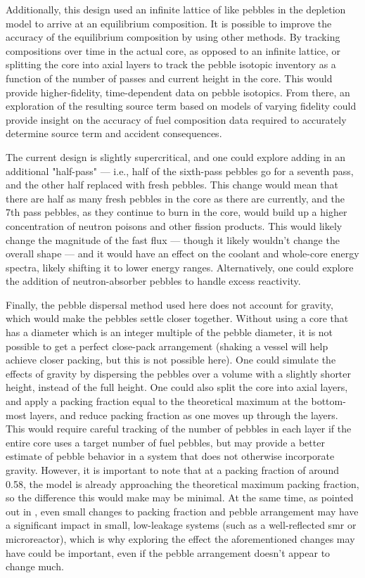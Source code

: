 Additionally, this design used an infinite lattice of like pebbles in the depletion model to arrive at an equilibrium composition.  It is possible to improve the accuracy of the equilibrium composition by using other methods.  By tracking compositions over time in the actual core, as opposed to an infinite lattice, or splitting the core into axial layers to track the pebble isotopic inventory as a function of the number of passes and current height in the core.  This would provide higher-fidelity, time-dependent data on pebble isotopics.  From there, an exploration of the resulting source term based on models of varying fidelity could provide insight on the accuracy of fuel composition data required to accurately determine source term and accident consequences.

The current design is slightly supercritical, and one could explore adding in an additional "half-pass" --- i.e., half of the sixth-pass pebbles go for a seventh pass, and the other half replaced with fresh pebbles.  This change would mean that there are half as many fresh pebbles in the core as there are currently, and the 7th pass pebbles, as they continue to burn in the core, would build up a higher concentration of neutron poisons and other fission products.  This would likely change the magnitude of the fast flux --- though it likely wouldn't change the overall shape --- and it would have an effect on the coolant and whole-core energy spectra, likely shifting it to lower energy ranges.  Alternatively, one could explore the addition of neutron-absorber pebbles to handle excess reactivity.

Finally, the pebble dispersal method used here does not account for gravity, which would make the pebbles settle closer together.  Without using a core that has a diameter which is an integer multiple of the pebble diameter, it is not possible to get a perfect close-pack arrangement (shaking a vessel will help achieve closer packing, but this is not possible here).  One could simulate the effects of gravity by dispersing the pebbles over a volume with a slightly shorter height, instead of the full height.  One could also split the core into axial layers, and apply a packing fraction equal to the theoretical maximum at the bottom-most layers, and reduce packing fraction as one moves up through the layers.  This would require careful tracking of the number of pebbles in each layer if the entire core uses a target number of fuel pebbles, but may provide a better estimate of pebble behavior in a system that does not otherwise incorporate gravity.  However, it is important to note that at a packing fraction of around 0.58, the model is already approaching the theoretical maximum packing fraction, so the difference this would make may be minimal.  At the same time, as pointed out in \cite{karriem_mcnp_2001}, even small changes to packing fraction and pebble arrangement may have a significant impact in small, low-leakage systems (such as a well-reflected \acrshort{smr} or microreactor), which is why exploring the effect the aforementioned changes may have could be important, even if the pebble arrangement doesn't appear to change much.